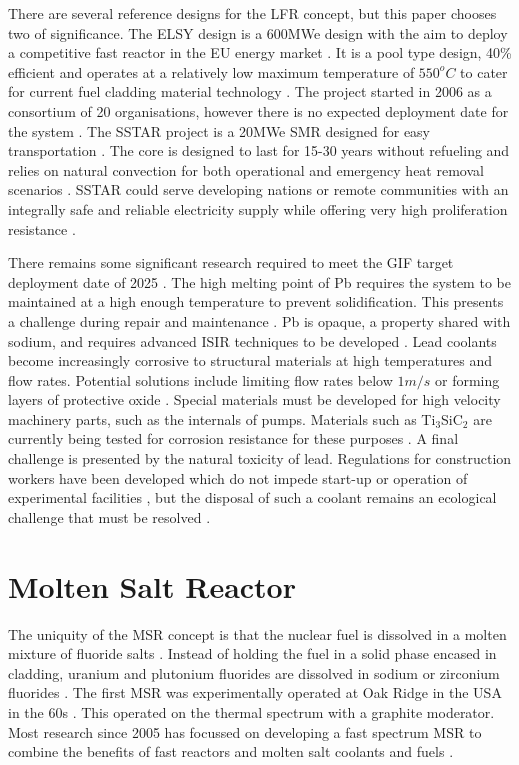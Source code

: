 \documentclass[journal]{IEEEtran}
\begin{document}
There are several reference designs for the LFR concept, but this paper chooses two of significance.
The ELSY design is a 600MWe design with the aim to deploy a competitive fast reactor in the EU energy market \cite{Locatelli2013}.
It is a pool type design, 40\% efficient and operates at a relatively low maximum temperature of $550^{o}C$ to cater for current fuel cladding material technology \cite{Int2012}.
The project started in 2006 as a consortium of 20 organisations, however there is no expected deployment date for the system \cite{GenIVForum}.
The SSTAR project is a 20MWe SMR designed for easy transportation \cite{GenIVForum}.
The core is designed to last for 15-30 years without refueling and relies on natural convection for both operational and emergency heat removal scenarios \cite{Int2012}.
SSTAR could serve developing nations or remote communities with an integrally safe and reliable electricity supply while offering very high proliferation resistance \cite{Int2012}.

There remains some significant research required to meet the GIF target deployment date of 2025 \cite{GenIVRoadmap}.
The high melting point of Pb requires the system to be maintained at a high enough temperature to prevent solidification. 
This presents a challenge during repair and maintenance \cite{GenIVForum}.
Pb is opaque, a property shared with sodium, and requires advanced ISIR techniques to be developed \cite{GenIVForum}.
Lead coolants become increasingly corrosive to structural materials at high temperatures and flow rates.
Potential solutions include limiting flow rates below $1m/s$ or forming layers of protective oxide \cite{Int2012}.
Special materials must be developed for high velocity machinery parts, such as the internals of pumps.
Materials such as Ti$_3$SiC$_2$ are currently being tested for corrosion resistance for these purposes \cite{Int2012}.
A final challenge is presented by the natural toxicity of lead.
Regulations for construction workers have been developed which do not impede start-up or operation of experimental facilities \cite{Int2012}, but the disposal of such a coolant remains an ecological challenge that must be resolved \cite{Locatelli2013}.



\section{Molten Salt Reactor}
The uniquity of the MSR concept is that the nuclear fuel is dissolved in a molten mixture of fluoride salts \cite{GenIVRoadmap}.
Instead of holding the fuel in a solid phase encased in cladding, uranium and plutonium fluorides are dissolved in sodium or zirconium fluorides \cite{Marques2010a}.
The first MSR was experimentally operated at Oak Ridge in the USA in the 60s \cite{Marques2010a}.
This operated on the thermal spectrum with a graphite moderator.
Most research since 2005 has focussed on developing a fast spectrum MSR to combine the benefits of fast reactors and molten salt coolants and fuels \cite{GenIVForum}.
\end{document}
